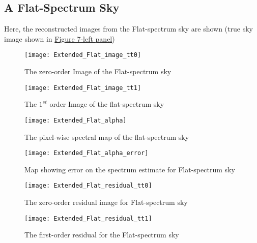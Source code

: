 \documentclass{article}
\begin{document}
\subsection{A Flat-Spectrum Sky}
Here, the reconstructed images from the Flat-spectrum sky are shown (true sky image shown in \hyperref[7]{Figure 7-left panel})
 \begin{figure}[H]
\centering
\texttt{[image: Extended\_Flat\_image\_tt0]}
\caption{The zero-order Image of the Flat-spectrum sky}
\label{fig:Extended_Flat_image_tt0}
\end{figure}
\begin{figure}[H]
\centering
\texttt{[image: Extended\_Flat\_image\_tt1]}
\caption{The $1^{st}$ order Image of the flat-spectrum sky}
\label{fig:Extended_Flat_image_tt1}
\end{figure}
\begin{figure}[H]
\centering
\texttt{[image: Extended\_Flat\_alpha]}
\caption{The pixel-wise spectral map of the flat-spectrum sky}
\label{fig:Extended_Flat_alpha}
\end{figure}
\begin{figure}[H]
\centering
\texttt{[image: Extended\_Flat\_alpha\_error]}
\caption{Map showing error on the spectrum estimate for Flat-spectrum sky}
\label{fig:Extended_Flat_alpha_error}
\end{figure}
\begin{figure}[H]
\centering
\texttt{[image: Extended\_Flat\_residual\_tt0]}
\caption{The zero-order residual image for Flat-spectrum sky}
\label{fig:Extended_Flat_residual_tt0}
\end{figure}
\begin{figure}[H]
\centering
\texttt{[image: Extended\_Flat\_residual\_tt1]}
\caption{The first-order residual for the Flat-spectrum sky}
\label{fig:Extended_Flat_residual_tt1}
\end{figure}
\end{document}
